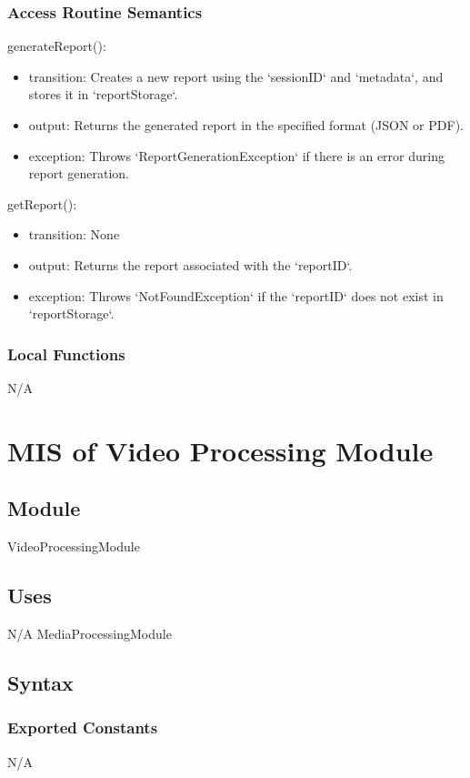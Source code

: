 \documentclass[12pt, titlepage]{article}
\begin{document}
\subsubsection{Access Routine Semantics}

\noindent generateReport():
\begin{itemize}
\item transition: Creates a new report using the `sessionID` and `metadata`, and stores it in `reportStorage`.
\item output: Returns the generated report in the specified format (JSON or PDF).
\item exception: Throws `ReportGenerationException` if there is an error during report generation.
\end{itemize}

\noindent getReport():
\begin{itemize}
\item transition: None
\item output: Returns the report associated with the `reportID`.
\item exception: Throws `NotFoundException` if the `reportID` does not exist in `reportStorage`.
\end{itemize}

\subsubsection{Local Functions}

N/A
\section{MIS of Video Processing Module} \label{VideoProcessingModule}

\subsection{Module}
VideoProcessingModule

\subsection{Uses}
N/A
MediaProcessingModule

\subsection{Syntax}

\subsubsection{Exported Constants}
N/A
\end{document}
